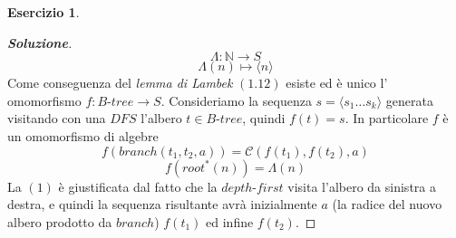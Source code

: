 \documentclass{article}
\theoremstyle{definition}
\newtheorem{esercizio}{Esercizio}
\theoremstyle{definition}
\theoremstyle{definition}
\theoremstyle{remark}
\begin{document}
\begin{esercizio}
\begin{proof}[\textbf{Soluzione}]
            $$\Lambda : \mathbb{N}\to S$$
            $$\Lambda(n)\mapsto \langle n\rangle$$
            Come conseguenza del \textit{lemma di Lambek} $(1.12)$ esiste  ed è unico l' omomorfismo $f:B\text{-}tree\to S$.
            Consideriamo la sequenza $s = \langle s_1\dots s_k\rangle$ generata visitando con una $DFS$ l'albero $t\in B\text{-}tree$,
            quindi $f(t) = s$. In particolare $f$ è un omomorfismo di algebre
            \begin{equation}
                f(branch(t_1,t_2,a)) = \mathcal{C}(f(t_1),f(t_2),a)
            \end{equation}
            \begin{equation}
                f(root^*(n)) = \Lambda(n)
            \end{equation}
            La $(1)$ è giustificata dal fatto che la  $depth$-$first$ visita l'albero  da  sinistra a destra, e quindi la sequenza
            risultante avrà inizialmente $a$ (la radice del nuovo albero prodotto da $branch$) $f(t_1)$  ed infine $f(t_2)$.
        \end{proof}
    \end{esercizio}
\end{document}
